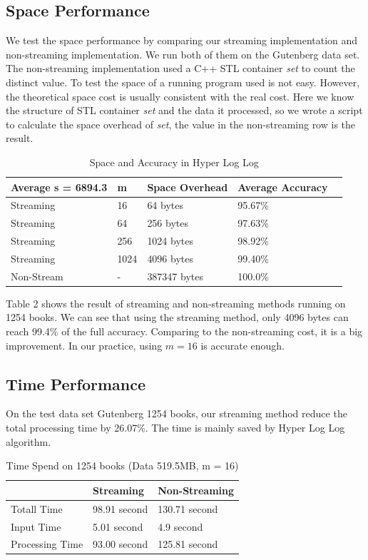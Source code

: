 \documentclass{article}
\begin{document}
\subsection{Space Performance}
We test the space performance by comparing our streaming implementation and non-streaming implementation. We run both of them on the Gutenberg data set. The non-streaming implementation used a C++ STL container \textit{set} to count the distinct value. To test the space of a running program used is not easy. However, the theoretical space cost is usually consistent with the real cost. Here we know the structure of STL container \textit{set} and the data it processed, so we wrote a script to calculate the space overhead of \textit{set}, the value in the non-streaming row is the result.
\begin{table}[H]
\begin{center}
\begin{tabular}{ | m{10em} | m{5em}| m{10em} | m{5em} | m{5em} |} 
\hline
Average s = 6894.3 & m & Space Overhead & Average Accuracy \\ 
\hline
Streaming & 16 & 64 bytes & 95.67\% \\ 
\hline
Streaming & 64 & 256 bytes & 97.63\% \\ 
\hline
Streaming & 256 & 1024 bytes & 98.92\% \\ 
\hline
Streaming & 1024 & 4096 bytes & 99.40\% \\
\hline
Non-Stream & - & 387347 bytes & 100.0\% \\
\hline
\end{tabular}
\end{center}
\caption{Space and Accuracy in Hyper Log Log} \label{tab: testtime}
\end{table}
Table 2 shows the result of streaming and non-streaming methods running on 1254 books. We can see that using the streaming method, only 4096 bytes can reach 99.4\% of the full accuracy. Comparing to the non-streaming cost, it is a big improvement. In our practice, using $m = 16$ is accurate enough.
\subsection{Time Performance}
On the test data set Gutenberg 1254 books, our streaming method reduce the total processing time by 26.07\%. The time is mainly saved by Hyper Log Log algorithm.
\begin{table}[H]
\begin{center}
\begin{tabular}{ | m{10em} | m{10em}| m{10em} | } 
\hline
& Streaming  & Non-Streaming \\ 
\hline
Totall Time & 98.91 second & 130.71 second \\ 
\hline
Input Time & 5.01 second & 4.9 second \\
\hline
Processing Time & 93.00 second & 125.81 second \\
\hline
\end{tabular}
\end{center}
\caption{Time Spend on 1254 books (Data 519.5MB, m = 16)} \label{tab: testtime}
\end{table}
\end{document}

